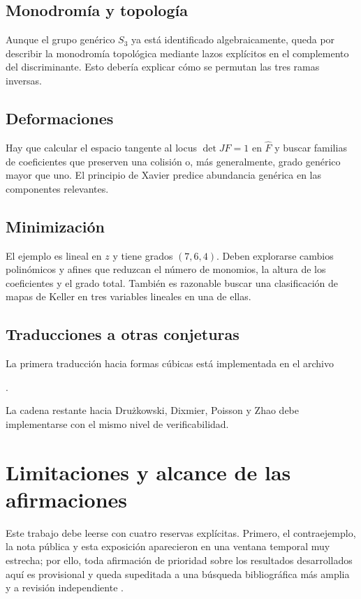 \documentclass[11pt]{article}
\theoremstyle{definition}
\theoremstyle{remark}
\begin{document}
\subsection{Monodrom\'ia y topolog\'ia}

Aunque el grupo gen\'erico $S_3$ ya est\'a identificado algebraicamente, queda
por describir la monodrom\'ia topol\'ogica mediante lazos expl\'icitos en el
complemento del discriminante. Esto deber\'ia explicar c\'omo se permutan las
tres ramas inversas.

\subsection{Deformaciones}

Hay que calcular el espacio tangente al locus $\det JF=1$ en $\widehat F$ y
buscar familias de coeficientes que preserven una colisi\'on o, m\'as
generalmente, grado gen\'erico mayor que uno. El principio de Xavier predice
abundancia gen\'erica en las componentes relevantes.

\subsection{Minimizaci\'on}

El ejemplo es lineal en $z$ y tiene grados $(7,6,4)$. Deben explorarse cambios
polin\'omicos y afines que reduzcan el n\'umero de monomios, la altura de los
coeficientes y el grado total. Tambi\'en es razonable buscar una clasificaci\'on
de mapas de Keller en tres variables lineales en una de ellas.

\subsection{Traducciones a otras conjeturas}

La primera traducci\'on hacia formas c\'ubicas est\'a implementada en el archivo
\begin{center}
.
\end{center}
La cadena restante hacia
Dru\.zkowski, Dixmier, Poisson y Zhao debe implementarse con el mismo nivel de
verificabilidad.

\section{Limitaciones y alcance de las afirmaciones}

Este trabajo debe leerse con cuatro reservas expl\'icitas. Primero, el
contraejemplo, la nota p\'ublica y esta exposici\'on aparecieron en una ventana
temporal muy estrecha; por ello, toda afirmaci\'on de prioridad sobre los
resultados desarrollados aqu\'i es provisional y queda supeditada a una
b\'usqueda bibliogr\'afica m\'as amplia y a revisi\'on independiente
\cite{CounterexampleNote2026}.
\end{document}
